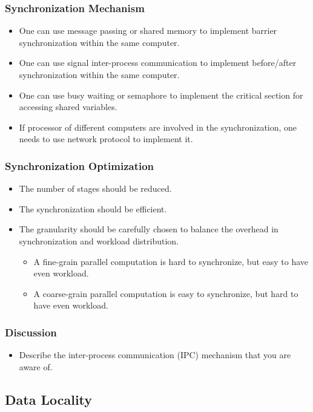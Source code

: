 \documentclass{beamer}
\begin{document}
\begin{CJK}{UTF8}{bsmi}
\begin{frame}
\frametitle{Synchronization Mechanism}
\begin{itemize}
\item One can use message passing or shared memory to implement
  barrier synchronization within the same computer.
\item One can use signal inter-process communication to implement
  before/after synchronization within the same computer. 
\item One can use busy waiting or semaphore to implement the critical
  section for accessing shared variables.
\item If processor of different computers are involved in the
  synchronization, one needs to use network protocol to implement it.
\end{itemize}
\end{frame}


\begin{frame}
\frametitle{Synchronization Optimization}
\begin{itemize}
\item The number of stages should be reduced.
\item The synchronization should be efficient.
\item The granularity should be carefully chosen to balance the
  overhead in synchronization and workload distribution.
\begin{itemize}
\item A fine-grain parallel computation is hard to synchronize, but
  easy to have even workload.
\item A coarse-grain parallel computation is easy to synchronize, but
  hard to have even workload.
\end{itemize}
\end{itemize}
\end{frame}

\begin{frame}
\frametitle{Discussion}
\begin{itemize}
\item Describe the inter-process communication (IPC) mechanism that
  you are aware of.
\end{itemize}
\end{frame}


\subsection{Data Locality}


\end{CJK}
\end{document}
